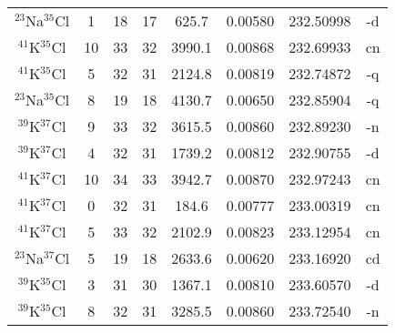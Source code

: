 \begin{table*}[htp]
\begin{tabular}{cccccccc}
$^{23}$Na$^{35}$Cl & 1 & 18 & 17 & 625.7 & 0.00580 & 232.50998 & -d \\
$^{41}$K$^{35}$Cl & 10 & 33 & 32 & 3990.1 & 0.00868 & 232.69933 & cn \\
$^{41}$K$^{35}$Cl & 5 & 32 & 31 & 2124.8 & 0.00819 & 232.74872 & -q \\
$^{23}$Na$^{35}$Cl & 8 & 19 & 18 & 4130.7 & 0.00650 & 232.85904 & -q \\
$^{39}$K$^{37}$Cl & 9 & 33 & 32 & 3615.5 & 0.00860 & 232.89230 & -n \\
$^{39}$K$^{37}$Cl & 4 & 32 & 31 & 1739.2 & 0.00812 & 232.90755 & -d \\
$^{41}$K$^{37}$Cl & 10 & 34 & 33 & 3942.7 & 0.00870 & 232.97243 & cn \\
$^{41}$K$^{37}$Cl & 0 & 32 & 31 & 184.6 & 0.00777 & 233.00319 & cn \\
$^{41}$K$^{37}$Cl & 5 & 33 & 32 & 2102.9 & 0.00823 & 233.12954 & cn \\
$^{23}$Na$^{37}$Cl & 5 & 19 & 18 & 2633.6 & 0.00620 & 233.16920 & cd \\
$^{39}$K$^{35}$Cl & 3 & 31 & 30 & 1367.1 & 0.00810 & 233.60570 & -d \\
$^{39}$K$^{35}$Cl & 8 & 32 & 31 & 3285.5 & 0.00860 & 233.72540 & -n \\
\hline
\end{tabular}

\par 
\end{table*}
